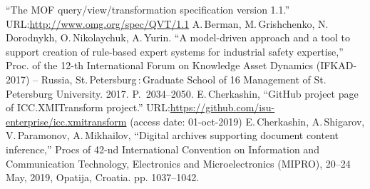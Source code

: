 \documentclass[conference]{IEEEtran}
\begin{document}
\begin{thebibliography}{99}
 ``The MOF query/view/transformation specification version 1.1.'' URL:\url{http://www.omg.org/spec/QVT/1.1}
 A.\,Berman, M.\,Grishchenko, N.\,Dorodnykh, O.\,Nikolaychuk, A.\,Yurin. ``A model-driven approach and a tool to support creation of rule-based expert systems for industrial safety expertise,'' Proc. of the 12-th International Forum on Knowledge Asset Dynamics (IFKAD-2017) -- Russia, St.\,Petersburg\,:\,Graduate School of 16 Management of St.\,Petersburg University.  2017.  P.~2034--2050.
 E.\,Cherkashin, ``GitHub project page of ICC.XMITransform project.'' URL:\url{https://github.com/isu-enterprise/icc.xmitransform} (access date: 01-oct-2019)
 E.\,Cherkashin, A.\,Shigarov, V.\,Paramonov, A.\,Mikhailov,  ``Digital archives supporting document content inference,'' Procs of 42-nd International Convention on Information and Communication Technology, Electronics and Microelectronics (MIPRO), 20--24 May, 2019, Opatija, Croatia. pp. 1037--1042.










\end{thebibliography}
\end{document}
